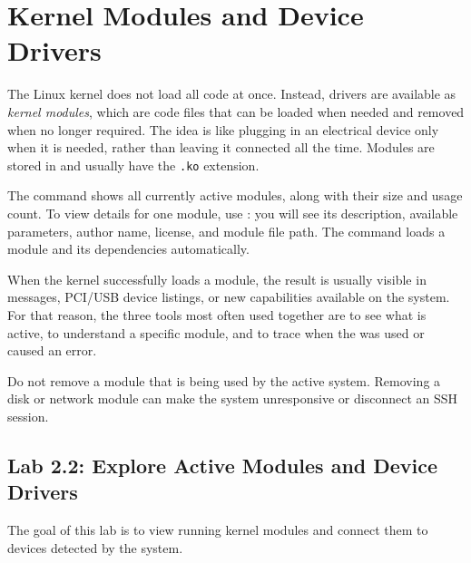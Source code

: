 \section{Kernel Modules and Device Drivers}
\label{sec:kernel-modules}

The Linux kernel does not load all  code at once. Instead, drivers are available as \textit{kernel modules}, which are code files that can be loaded when needed and removed when no longer required. The idea is like plugging in an electrical device only when it is needed, rather than leaving it connected all the time. Modules are stored in  and usually have the \texttt{.ko} extension.

The  command shows all currently active modules, along with their size and usage count. To view details for one module, use : you will see its description, available parameters, author name, license, and module file path. The  command loads a module and its dependencies automatically.

When the kernel successfully loads a module, the result is usually visible in  messages, PCI/USB device listings, or new capabilities available on the system. For that reason, the three tools most often used together are  to see what is active,  to understand a specific module, and  to trace when the  was used or caused an error.

\begin{warningbox}
Do not remove a module that is being used by the active system. Removing a disk  or network module can make the system unresponsive or disconnect an SSH session.
\end{warningbox}

\subsection*{Lab 2.2: Explore Active Modules and Device Drivers}

The goal of this lab is to view running kernel modules and connect them to devices detected by the system.


